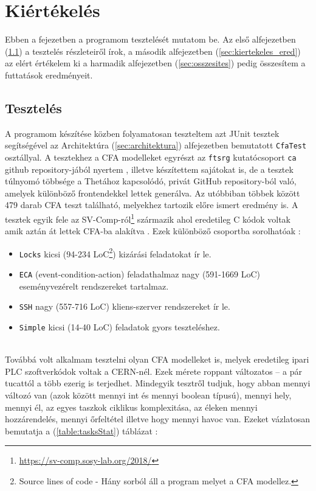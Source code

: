 \chapter{Kiértékelés}
\label{sec:kiertekeles}

Ebben a fejezetben a programom tesztelését mutatom be. Az első alfejezetben (\ref{sec:kiertekeles_teszt}) a tesztelés részleteiről írok, a második alfejezetben (\ref{sec:kiertekeles_ered}) az elért értékelem ki a harmadik alfejezetben (\ref{sec:osszesites}) pedig összesítem a futtatások eredményeit.

\section{Tesztelés}
\label{sec:kiertekeles_teszt}
A programom készítése közben folyamatosan teszteltem azt JUnit tesztek segítségével az Architektúra (\ref{sec:architektura}) alfejezetben bemutatott \texttt{CfaTest} osztállyal. A tesztekhez a CFA modelleket egyrészt az \texttt{ftsrg} kutatócsoport \texttt{ca} github repository-jából nyertem \cite{ca-lab-tests}, illetve készítettem sajátokat is, de a tesztek túlnyomó többsége a Thetához kapcsolódó, privát GitHub repository-ból való, amelyek különböző frontendekkel lettek generálva. Az utóbbiban többek között 479 darab CFA teszt található, melyekhez tartozik előre ismert eredmény is. A tesztek egyik fele az SV-Comp-ról\footnote{\url{https://sv-comp.sosy-lab.org/2018/}} származik ahol eredetileg C kódok voltak amik aztán át lettek CFA-ba alakítva \cite{vpt2017}. Ezek különböző csoportba sorolhatóak \cite{akos-phd}:

\begin{itemize}
	\label{felsorolas}
	
	\item \texttt{Locks} kicsi (94-234 LoC\footnote{Source lines of code - Hány sorból áll a program melyet a CFA modellez.}) kizárási feladatokat ír le.
	
	\item \texttt{ECA} (event-condition-action) feladathalmaz nagy (591-1669 LoC) eseményvezérelt rendszereket tartalmaz.
	
	\item \texttt{SSH} nagy (557-716 LoC) kliens-szerver rendszereket ír le.
	
	\item \texttt{Simple} kicsi (14-40 LoC) feladatok gyors teszteléshez.
\end{itemize}
\ \\
Továbbá volt alkalmam tesztelni olyan CFA modelleket is, melyek eredetileg ipari PLC szoftverkódok voltak a CERN-nél. \cite{darvas2019plcverif} Ezek mérete roppant változatos -- a pár tucattól a több ezerig is terjedhet. Mindegyik tesztről tudjuk, hogy abban mennyi változó van (azok között mennyi int és mennyi boolean típusú), mennyi hely, mennyi él, az egyes taszkok ciklikus komplexitása, az éleken mennyi hozzárendelés, mennyi őrfeltétel illetve hogy mennyi havoc van. Ezeket vázlatosan bemutatja a (\ref{table:tasksStat}) táblázat \cite{akos-phd}:

